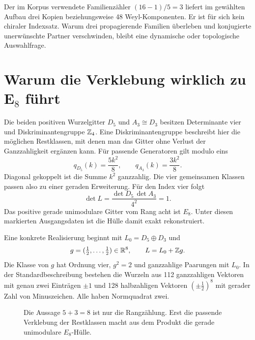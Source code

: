 Der im Korpus verwendete Familienzähler $(16-1)/5=3$ liefert im gewählten Aufbau drei Kopien beziehungsweise 48 Weyl-Komponenten. Er ist für sich kein chiraler Indexsatz. Warum drei propagierende Familien überleben und konjugierte unerwünschte Partner verschwinden, bleibt eine dynamische oder topologische Auswahlfrage.

\section{Warum die Verklebung wirklich zu E\texorpdfstring{$_8$}{8} führt}
Die beiden positiven Wurzelgitter $D_5$ und $A_3\cong D_3$ besitzen Determinante vier und Diskriminantengruppe $\mathbb Z_4$. Eine Diskriminantengruppe beschreibt hier die möglichen Restklassen, mit denen man das Gitter ohne Verlust der Ganzzahligkeit ergänzen kann. Für passende Generatoren gilt modulo eins
\begin{equation}
q_{D_5}(k)=\frac{5k^2}{8},\qquad
q_{A_3}(k)=\frac{3k^2}{8}.
\end{equation}
Diagonal gekoppelt ist die Summe $k^2$ ganzzahlig. Die vier gemeinsamen Klassen passen also zu einer geraden Erweiterung. Für den Index vier folgt
\begin{equation}
\det L=\frac{\det D_5\,\det A_3}{4^2}=1.
\end{equation}
Das positive gerade unimodulare Gitter vom Rang acht ist $E_8$. Unter diesen markierten Ausgangsdaten ist die Hülle damit exakt rekonstruiert. 

Eine konkrete Realisierung beginnt mit $L_0=D_5\oplus D_3$ und
\begin{equation}
g=(\tfrac12,\ldots,\tfrac12)\in\mathbb R^8,
\qquad L=L_0+\mathbb Z g.
\end{equation}
Die Klasse von $g$ hat Ordnung vier, $g^2=2$ und ganzzahlige Paarungen mit $L_0$. In der Standardbeschreibung bestehen die Wurzeln aus 112 ganzzahligen Vektoren mit genau zwei Einträgen $\pm1$ und 128 halbzahligen Vektoren $(\pm\frac12)^8$ mit gerader Zahl von Minuszeichen. Alle haben Normquadrat zwei.

\begin{figure}[H]\centering
{}
\caption{Die Aussage $5+3=8$ ist nur die Rangzählung. Erst die passende Verklebung der Restklassen macht aus dem Produkt die gerade unimodulare $E_8$-Hülle.}
\end{figure}

